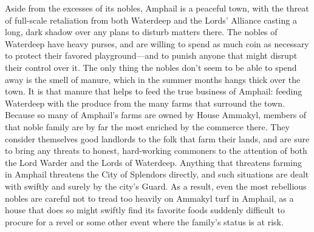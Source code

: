 \documentclass[10pt,a4paper,twoside,twocolumn,openany,bg=print,nodeprecatedcode]{dndbook}
\begin{document}
Aside from the excesses of its nobles, Amphail is a peaceful town, with the threat of full-scale retaliation from both Waterdeep and the Lords' Alliance casting a long, dark shadow over any plans to disturb matters there. The nobles of Waterdeep have heavy purses, and are willing to spend as much coin as necessary to protect their favored playground—and to punish anyone that might disrupt their control over it. The only thing the nobles don't seem to be able to spend away is the smell of manure, which in the summer months hangs thick over the town. It is that manure that helps to feed the true business of Amphail: feeding Waterdeep with the produce from the many farms that surround the town.
Because so many of Amphail's farms are owned by House Ammakyl, members of that noble family are by far the most enriched by the commerce there. They consider themselves good landlords to the folk that farm their lands, and are sure to bring any threats to honest, hard-working commoners to the attention of both the Lord Warder and the Lords of Waterdeep. Anything that threatens farming in Amphail threatens the City of Splendors directly, and such situations are dealt with swiftly and surely by the city's Guard. As a result, even the most rebellious nobles are careful not to tread too heavily on Ammakyl turf in Amphail, as a house that does so might swiftly find its favorite foods suddenly difficult to procure for a revel or some other event where the family's status is at risk.
\end{document}
